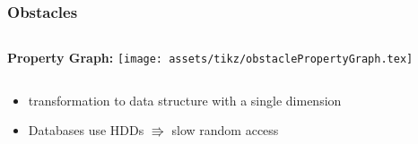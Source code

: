 \begin{frame}
    \frametitle{Obstacles}

    \begin{columns}

        \textbf{Property Graph:}
        \vfill
        \centering
        \texttt{[image: assets/tikz/obstaclePropertyGraph.tex]}
    \end{columns}
    \vfill
    \begin{itemize}
        \item<3-> transformation to data structure with a single dimension
        \item<4-> Databases use HDDs $\Rrightarrow$ slow random access
    \end{itemize}

    
\end{frame}